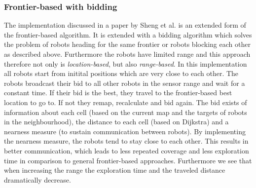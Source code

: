 	\subsubsection{Frontier-based with bidding}
	The implementation discussed in a paper by Sheng et al. \cite{sheng2006distributed} is an extended form of the frontier-based algorithm.
	It is extended with a bidding algorithm which solves the problem of robots heading for the same frontier or robots blocking each other as described above.
	Furthermore the robots have limited range and this approach therefore not only is \emph{location-based}, but also \emph{range-based}.
	In this implementation all robots start from initital positions which are very close to each other.
	The robots broadcast their bid to all other robots in the sensor range and wait for a constant time.
	If their bid is the best, they travel to the frontier-based best location to go to.
	If not they remap, recalculate and bid again.
	The bid exists of information about each cell (based on the current map and the targets of robots in the neighbourhood), the distance to each cell (based on Dijkstra) and a nearness measure (to sustain communication between robots).
	By implementing the nearness measure, the robots tend to stay close to each other. 
	This results in better communication, which leads to less repeated coverage and less exploration time in comparison to general frontier-based approaches.
	Furthermore we see that when increasing the range the exploration time and the traveled distance dramatically decrease.	


